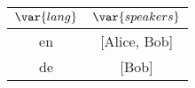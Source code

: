 \begin{tabular}{|c|c|}
	\hline
	$\var{lang}$ & $\var{speakers}$ \\ \hline
	en & [Alice, Bob] \\ \hline
	de & [Bob] \\ \hline
\end{tabular}


